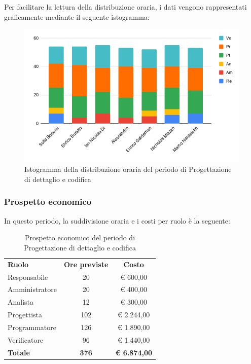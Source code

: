 \documentclass[../piano-di-progetto.tex]{subfiles}
\begin{document}
  Per facilitare la lettura della distribuzione oraria, i dati vengono rappresentati graficamente mediante il seguente istogramma:
  \begin{figure}[H]
    \centering
    \includegraphics[width=12cm]{img/ore-codifica.png}
    \caption{Istogramma della distribuzione oraria del periodo di Progettazione di dettaglio e codifica}
    \label{fig:ore-componente-codifica}
  \end{figure}

  \subsubsection{Prospetto economico}
  In questo periodo, la suddivisione oraria e i costi per ruolo è la seguente:

  \begin{table}[H]
    \centering
    \begin{tabular}{lcc}
      \rowcolor{lightgray}
      \textbf{Ruolo}  & \textbf{Ore previste} & \textbf{Costo}  \\
      Responsabile    & 20           & € 600,00            \\
      Amministratore  & 20           & € 400,00            \\
      Analista        & 12           & € 300,00            \\
      Progettista     & 102          & € 2.244,00          \\
      Programmatore   & 126          & € 1.890,00          \\
      Verificatore    & 96           & € 1.440,00          \\
      \textbf{Totale} & \textbf{376} & \textbf{€ 6.874,00}
    \end{tabular}
    \caption{Prospetto economico del periodo di Progettazione di dettaglio e codifica}
  \end{table}
\end{document}
